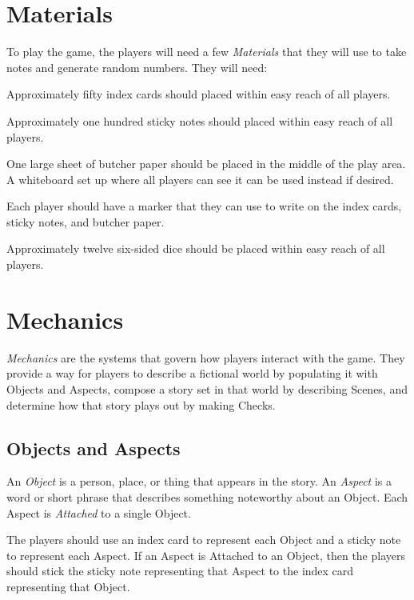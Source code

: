 \documentclass[12pt, a5paper, parskip=half-]{scrartcl}
\begin{document}
\section*{Materials}
To play the game, the players will need a few \emph{Materials} that they will use to take notes and generate random numbers. They will need:
\begin{description}[leftmargin=0pt]
	\item[Index Cards] Approximately fifty index cards should placed within easy reach of all players. 
	\item[Sticky Notes] Approximately one hundred sticky notes should placed within easy reach of all players.
	\item[Butcher Paper]	 One large sheet of butcher paper should be placed in the middle of the play area.  A whiteboard set up where all players can see it can be used instead if desired.
	\item[Markers] Each player should have a marker that they can use to write on the index cards, sticky notes, and butcher paper.
	\item[Dice] Approximately twelve six-sided dice should be placed within easy reach of all players. 
\end{description}

\newpage

\section*{Mechanics}    
\emph{Mechanics} are the systems that govern how players interact with the game.
They provide a way for players to describe a fictional world by populating it with Objects and Aspects, compose a story set in that world by describing Scenes, and determine how that story plays out by making Checks.

\subsection*{Objects and Aspects}
An \emph{Object} is a person, place, or thing that appears in the story.
An \emph{Aspect} is a word or short phrase that describes something noteworthy about an Object.
Each Aspect is \emph{Attached} to a single Object.

The players should use an index card to represent each Object and a sticky note to represent each Aspect.  If an Aspect is Attached to an Object, then the players should stick the sticky note representing that Aspect to the index card representing that Object.
\end{document}

